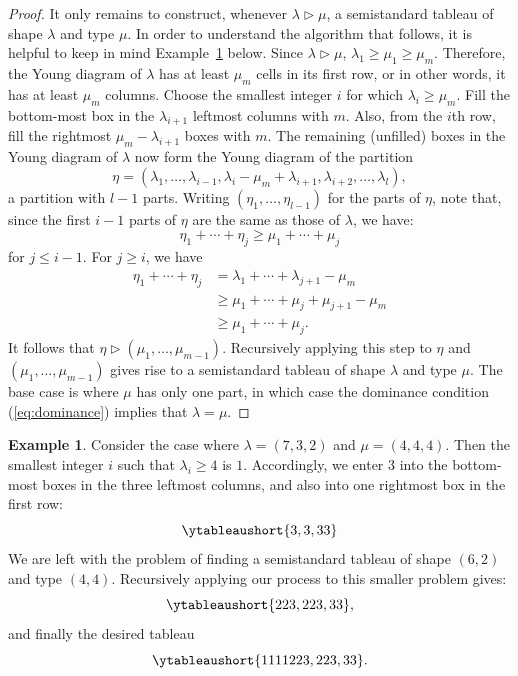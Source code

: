 \documentclass[11pt]{amsproc}
\theoremstyle{definition}
\theoremstyle{example}
\newtheorem{example}[theorem]{Example}
\begin{document}
\begin{proof}
  It only remains to construct, whenever $\lambda\rhd\mu$, a semistandard tableau of shape $\lambda$ and type $\mu$.
  In order to understand the algorithm that follows, it is helpful to keep in mind Example~\ref{example:can-tab} below.
  Since $\lambda\rhd\mu$, $\lambda_1\geq \mu_1\geq \mu_m$.
  Therefore, the Young diagram of $\lambda$ has at least $\mu_m$ cells in its first row, or in other words, it has at least $\mu_m$ columns.
  Choose the smallest integer $i$ for which $\lambda_i\geq\mu_m$.
  Fill the bottom-most box in the $\lambda_{i+1}$ leftmost columns with $m$.
  Also, from the $i$th row, fill the rightmost $\mu_m-\lambda_{i+1}$ boxes with $m$.
  The remaining (unfilled) boxes in the Young diagram of $\lambda$ now form the Young diagram of the partition
  \begin{displaymath}
  \eta=(\lambda_1,\dotsc,\lambda_{i-1}, \lambda_i - \mu_m + \lambda_{i+1}, \lambda_{i+2},\dotsc,\lambda_l), 
  \end{displaymath}
  a partition with $l-1$ parts.
  Writing $(\eta_1,\dotsc,\eta_{l-1})$ for the parts of $\eta$, note that, since the first $i-1$ parts of $\eta$ are the same as those of $\lambda$,
  we have:
  \begin{displaymath}
    \eta_1+\dotsb + \eta_j\geq \mu_1 + \dotsb + \mu_j
  \end{displaymath}
  for $j\leq i-1$.
  For $j\geq i$, we have
  \begin{align*}
    \eta_1 + \dotsb + \eta_j & = \lambda_1 + \dotsb + \lambda_{j+1} -\mu_m\\
                             & \geq \mu_1 + \dotsb + \mu_j + \mu_{j+1} - \mu_m\\
                             & \geq \mu_1 + \dotsb + \mu_j.
  \end{align*}
  It follows that $\eta\rhd (\mu_1,\dotsc,\mu_{m-1})$.
  Recursively applying this step to $\eta$ and $(\mu_1,\dotsc,\mu_{m-1})$ gives rise to a semistandard tableau of shape $\lambda$ and type $\mu$.
  The base case is where $\mu$ has only one part, in which case the dominance condition (\ref{eq:dominance}) implies that $\lambda=\mu$.
\end{proof}
\begin{example}
  \label{example:can-tab}
  Consider the case where $\lambda=(7,3,2)$ and $\mu=(4,4,4)$.
  Then the smallest integer $i$ such that $\lambda_i\geq 4$ is $1$.
  Accordingly, we enter $3$ into the bottom-most boxes in the three leftmost columns, and also into one rightmost box in the first row:
  \begin{displaymath}
    \ytableaushort{{}{}{}{}{}{}3,{}{}3,33}
  \end{displaymath}
  We are left with the problem of finding a semistandard tableau of shape $(6,2)$ and type $(4,4)$.
  Recursively applying our process to this smaller problem gives:
  \begin{displaymath}
    \ytableaushort{{}{}{}{}223,223,33},
  \end{displaymath}
  and finally the desired tableau
  \begin{displaymath}
    \ytableaushort{1111223,223,33}.
  \end{displaymath}
\end{example}
\end{document}
